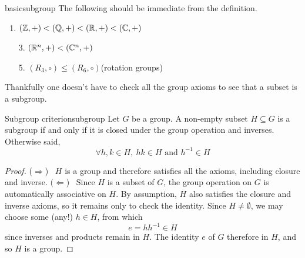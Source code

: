 \begin{examples}{}{basicsubgroup}
	The following should be immediate from the definition.
	\begin{enumerate}\itemsep2pt
	  \item\label{ex:basicsubgroup1} $(\mathbb{Z},+)<(\mathbb{Q},+)<(\mathbb{R},+)<(\mathbb{C},+)$
		\item[3.] $(\mathbb{R}^n,+)<(\mathbb{C}^n,+)$
		\item[5.]  $(R_3,\circ)\le (R_6,\circ)$\quad (rotation groups)
	\end{enumerate}
\end{examples}

Thankfully one doesn't have to check all the group axioms to see that a subset is a subgroup.

\begin{thm}{Subgroup criterion}{subgroup}
	Let $G$ be a group. A non-empty subset $H\subseteq G$ is a subgroup if and only if it is closed under the group operation and inverses. Otherwise said,
	\[
		\forall h,k\in H,\ hk\in H \text{ and }  h^{-1}\in H
	\]
\end{thm}

\begin{proof}
	($\Rightarrow$) \ $H$ is a group and therefore satisfies all the axioms, including closure and inverse.\smallbreak
	$(\Leftarrow$) \ Since $H$ is a subset of $G$, the group operation on $G$ is automatically associative\footnotemark{} on $H$. By assumption, $H$ also satisfies the closure and inverse axioms, so it remains only to check the identity.\smallbreak
	Since $H\neq\emptyset$, we may choose some (any!) $h\in H$, from which
	\[
		e=hh^{-1}\in H
	\]
	since inverses and products remain in $H$. The identity $e$ of $G$ therefore in $H$, and so $H$ is a group.
\end{proof}



